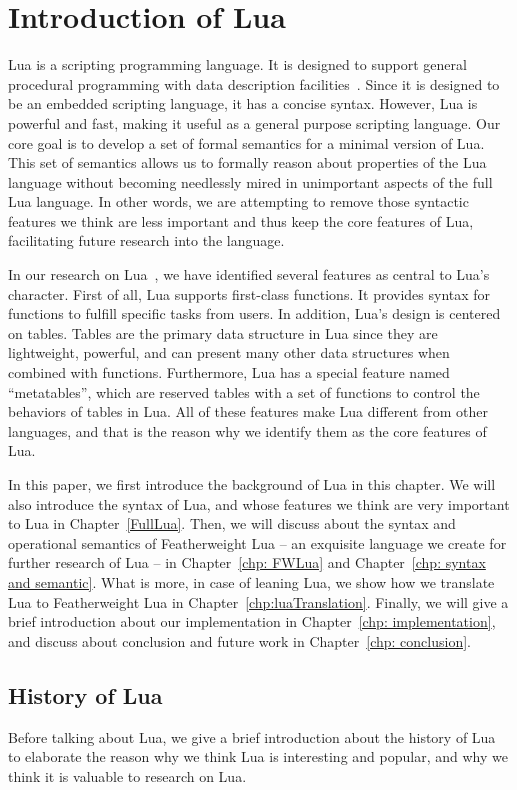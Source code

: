 \chapter{Introduction of Lua}
Lua is a scripting programming language. It is designed to support general procedural programming with data description facilities~\cite{EEL}. Since it is designed to be an embedded scripting language, it has a concise syntax. However, Lua is powerful and fast, making it useful as a general purpose scripting language.
Our core goal is to develop a set of formal semantics for a minimal version of Lua. This set of semantics allows us to formally reason about properties of the Lua language without becoming needlessly mired in unimportant aspects of the full Lua language. In other words, we are attempting to remove those syntactic features we think are less important and thus keep the core features of Lua, facilitating future research into the language.

In our research on Lua~\cite{LRM}, we have identified several features as central to Lua's character. First of all, Lua supports first-class functions. It provides syntax for functions to fulfill specific tasks from users. In addition, Lua's design is centered on tables. Tables are the primary data structure in Lua since they are lightweight, powerful, and can present many other data structures when combined with functions. Furthermore, Lua has a special feature named ``metatables'', which are reserved tables with a set of functions to control the behaviors of tables in Lua. All of these features make Lua different from other languages, and that is the reason why we identify them as the core features of Lua.

In this paper, we first introduce the background of Lua in this chapter. We will also introduce the syntax of Lua, and whose features we think are very important to Lua in Chapter~\ref{FullLua}. Then, we will discuss about the syntax and operational semantics of Featherweight Lua -- an exquisite language we create for further research of Lua -- in Chapter~\ref{chp: FWLua} and Chapter~\ref{chp: syntax and semantic}. What is more, in case of leaning Lua, we show how we translate Lua to Featherweight Lua in Chapter~\ref{chp:luaTranslation}. Finally, we will give a brief introduction about our implementation in Chapter~\ref{chp: implementation}, and discuss about conclusion and future work in Chapter~\ref{chp: conclusion}.


\section{History of Lua}
Before talking about Lua, we give a brief introduction about the history of Lua to elaborate the reason why we think Lua is interesting and popular, and why we think it is valuable to research on Lua.

